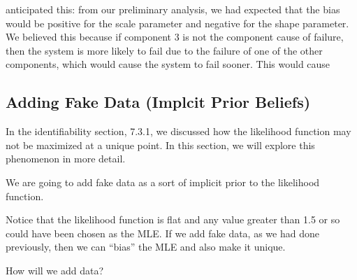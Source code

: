 \documentclass[
]{article}
\begin{document}
\begin{enumerate}
  anticipated this: from our preliminary analysis, we had expected that
  the bias would be positive for the scale parameter and negative for
  the shape parameter. We believed this because if component 3 is not
  the component cause of failure, then the system is more likely to fail
  due to the failure of one of the other components, which would cause
  the system to fail sooner. This would cause
\end{enumerate}

\hypertarget{adding-fake-data-implcit-prior-beliefs}{%
\subsection{Adding Fake Data (Implcit Prior
Beliefs)}\label{adding-fake-data-implcit-prior-beliefs}}

In the identifiability section, 7.3.1, we discussed how the likelihood
function may not be maximized at a unique point. In this section, we
will explore this phenomenon in more detail.

We are going to add fake data as a sort of implicit prior to the
likelihood function.

Notice that the likelihood function is flat and any value greater than
1.5 or so could have been chosen as the MLE. If we add fake data, as we
had done previously, then we can ``bias'' the MLE and also make it
unique.

How will we add data?
\end{document}
